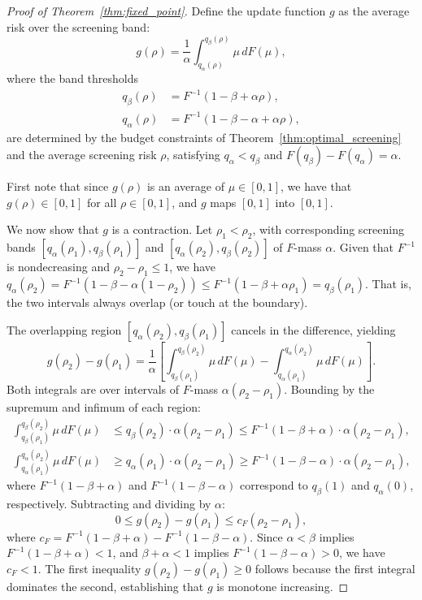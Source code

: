 \begin{proof}[Proof of Theorem~\ref{thm:fixed_point}]
    
    Define the update function $g$ as the average risk over the screening band:
    $$g(\rho) = \frac{1}{\alpha}\int_{q_{\alpha}(\rho)}^{q_{\beta}(\rho)} \mu \, dF(\mu),$$
    where the band thresholds
    \begin{align*}
        q_{\beta}(\rho) &= F^{-1}(1 - \beta + \alpha\rho), \\
        q_{\alpha}(\rho) &= F^{-1}(1 - \beta - \alpha + \alpha\rho),
    \end{align*}
    are determined by the budget constraints of Theorem~\ref{thm:optimal_screening} and the average screening risk $\rho$, satisfying $q_\alpha < q_\beta$ and $F(q_\beta) - F(q_\alpha) = \alpha$. 

    First note that since $g(\rho)$ is an average of $\mu \in [0,1]$, we have that $g(\rho) \in [0,1]$ for all $\rho \in [0,1]$, and $g$ maps $[0,1]$ into $[0,1]$. 
    
    We now show that $g$ is a contraction. Let $\rho_1 < \rho_2$, with corresponding screening bands $[q_{\alpha}(\rho_1), q_{\beta}(\rho_1)]$ and $[q_{\alpha}(\rho_2), q_{\beta}(\rho_2)]$ of $F$-mass $\alpha$. Given that $F^{-1}$ is nondecreasing and $\rho_2 - \rho_1 \leq 1$, we have  $q_{\alpha}(\rho_2) = F^{-1}(1 - \beta - \alpha(1-\rho_2)) \leq F^{-1}(1 - \beta + \alpha\rho_1) = q_{\beta}(\rho_1)$. That is, the two intervals always overlap (or touch at the boundary).
     
    The overlapping region $[q_{\alpha}(\rho_2), q_{\beta}(\rho_1)]$ cancels in the difference, yielding 
    $$g(\rho_2) - g(\rho_1) = \frac{1}{\alpha}\left[\int_{q_\beta(\rho_1)}^{q_\beta(\rho_2)}\mu\,dF(\mu) - \int_{q_\alpha(\rho_1)}^{q_\alpha(\rho_2)}\mu\,dF(\mu)\right].$$
    Both integrals are over intervals of $F$-mass $\alpha(\rho_2-\rho_1)$. Bounding by the supremum and infimum of each region:
    \begin{align*}
        \int_{q_\beta(\rho_1)}^{q_\beta(\rho_2)}\mu\,dF(\mu) &\leq q_\beta(\rho_2)\cdot\alpha(\rho_2-\rho_1) \leq F^{-1}(1-\beta+\alpha)\cdot\alpha(\rho_2-\rho_1),\\
        \int_{q_\alpha(\rho_1)}^{q_\alpha(\rho_2)}\mu\,dF(\mu) &\geq q_\alpha(\rho_1)\cdot\alpha(\rho_2-\rho_1) \geq F^{-1}(1-\beta-\alpha)\cdot\alpha(\rho_2-\rho_1),
    \end{align*}
    where $F^{-1}(1-\beta+\alpha)$ and $F^{-1}(1-\beta-\alpha)$ correspond to $q_{\beta}(1)$ and $q_{\alpha}(0)$, respectively. Subtracting and dividing by $\alpha$:
    $$0 \leq g(\rho_2) - g(\rho_1) \leq c_F(\rho_2-\rho_1),$$
    where $c_{F} = F^{-1}(1-\beta+\alpha) - F^{-1}(1-\beta-\alpha).$ Since $\alpha < \beta$ implies $F^{-1}(1-\beta+\alpha) < 1$, and $\beta+\alpha < 1$ implies $F^{-1}(1-\beta-\alpha) > 0$, we have $c_F < 1$. The first inequality $g(\rho_2) - g(\rho_1) \geq 0$ follows because the first integral dominates the second, establishing that $g$ is monotone increasing. 
    

\end{proof}
